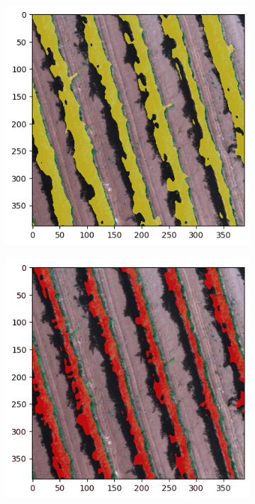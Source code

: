 \documentclass[comsoc,final]{IEEEtran}
\begin{document}
\begin{figure}
      \begin{subfigure}[b]{0.3\columnwidth}
         \centering
         \includegraphics[width=\columnwidth]{VITE0INF}
         \caption{}
     \end{subfigure}%
%
     \begin{subfigure}[b]{0.3\columnwidth}
         \centering
         \includegraphics[width=\columnwidth]{VITE1INF}

\end{subfigure}
\end{figure}
\end{document}
